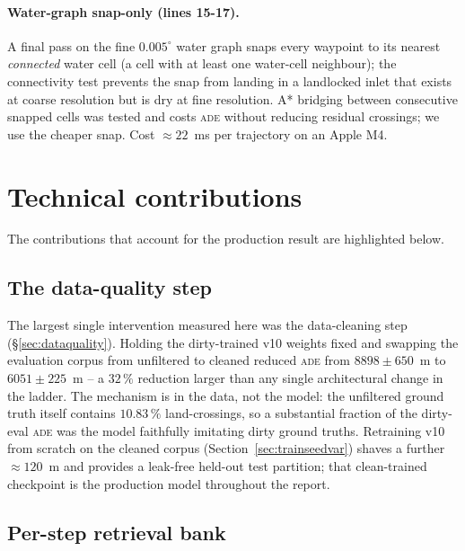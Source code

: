\documentclass[oneside, a4paper, onecolumn, 11pt]{article}
\newcommand{\ade}{\textsc{ade}}
\begin{document}
\paragraph{Water-graph snap-only (lines 15-17).}\label{sec:router}
A final pass on the fine $0.005^\circ$ water graph snaps every
waypoint to its nearest \emph{connected} water cell (a cell with at
least one water-cell neighbour); the connectivity test prevents the
snap from landing in a landlocked inlet that exists at coarse
resolution but is dry at fine resolution.  A* bridging between
consecutive snapped cells was tested and costs \ade{} without
reducing residual crossings; we use the cheaper snap.  Cost
$\approx 22$~ms per trajectory on an Apple M4.

\section{Technical contributions}\label{sec:contrib}

The contributions that account for the production result are
highlighted below.

\subsection{The data-quality step}

The largest single intervention measured here was the data-cleaning
step (§\ref{sec:dataquality}).  Holding the dirty-trained v10 weights
fixed and swapping the evaluation corpus from unfiltered to cleaned
reduced \ade{} from $8898 \pm 650$~m to $6051 \pm 225$~m -- a
$32\,\%$ reduction larger than any single architectural change in the
ladder.  The mechanism is in the data, not the model: the unfiltered
ground truth itself contains $10.83\,\%$ land-crossings, so a
substantial fraction of the dirty-eval \ade{} was the model
faithfully imitating dirty ground truths.  Retraining v10 from
scratch on the cleaned corpus (Section~\ref{sec:trainseedvar}) shaves
a further $\approx 120$~m and provides a leak-free held-out test
partition; that clean-trained checkpoint is the production model
throughout the report.

\subsection{Per-step retrieval bank}
\end{document}
